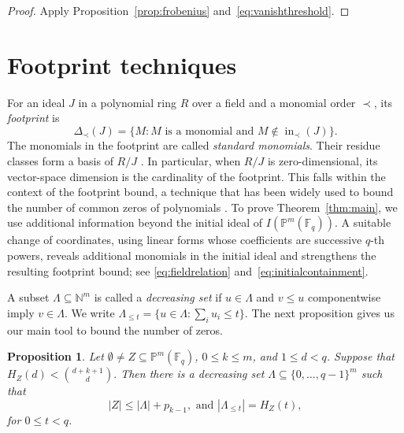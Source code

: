 \documentclass[11pt]{amsart}
\newtheorem{proposition}[theorem]{Proposition}
\theoremstyle{definition}
\newcommand{\F}{\mathbb F}
\newcommand{\N}{\mathbb N}
\newcommand{\PP}{\mathbb P}
\newcommand{\ini}{\operatorname{in}}
\newcommand{\card}[1]{\left|#1\right|}
\numberwithin{equation}{section}
\begin{document}
\begin{proof}
Apply Proposition~\ref{prop:frobenius}
and~\eqref{eq:vanishthreshold}.
\end{proof}



\section{Footprint techniques}\label{sec:transfer}

For an ideal $J$ in a polynomial ring $R$ over a field and a monomial
order $\prec$, its \emph{footprint} is
\[
 \Delta_\prec(J)=\{M:M\text{ is a monomial and }
                         M\notin\ini_\prec(J)\}.
\]
The monomials in the footprint are called \emph{standard monomials}.
Their residue classes form a basis of $R/J$
\cite[Thm.~15.3]{eisenbud}.
In particular, when $R/J$ is zero-dimensional, its vector-space dimension is the cardinality
of the footprint. This falls within the context of the footprint bound, a technique that has been widely used to bound the number of common zeros of polynomials \cite{BDG19footprint,sanjose_conjecture}. To prove Theorem~\ref{thm:main}, we use additional information
beyond the initial ideal of $I(\PP^m(\F_q))$.
A suitable change of coordinates, using linear forms whose
coefficients are successive $q$-th powers, reveals additional
monomials in the initial ideal and strengthens the resulting
footprint bound; see \eqref{eq:fieldrelation}
and~\eqref{eq:initialcontainment}.

A subset $\Lambda\subseteq\N^m$ is called a \emph{decreasing set} if
$u\in\Lambda$ and $v\le u$ componentwise imply $v\in\Lambda$.
We write $\Lambda_{\le t}=\{u\in\Lambda:\sum_i u_i\le t\}$.
The next proposition gives us our main tool to bound the number of zeros. 


\begin{proposition}\label{prop:transfer}
Let $\emptyset \ne Z\subseteq\PP^m(\F_q)$, $0\le k\le m$,
and $1\le d<q$. Suppose that
\(
 H_Z(d)<\binom{d+k+1}{d}.
\)
Then there is a decreasing set $\Lambda\subseteq\{0,\ldots,q-1\}^m$
such that
\begin{equation}\label{eq:transfer}
 \card Z\le\card\Lambda+p_{k-1},
 \text{ and }
 \card{\Lambda_{\le t}}=H_Z(t),
\end{equation}
for $0\leq t <q$.
\end{proposition}
\end{document}
